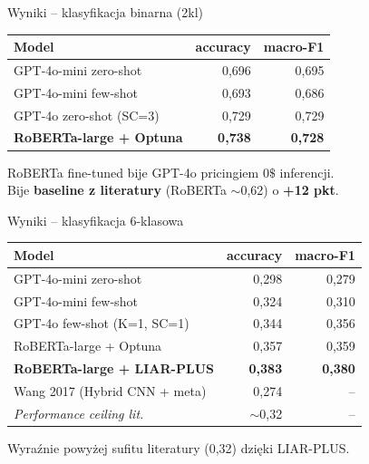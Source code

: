 \documentclass[10pt]{beamer}
\begin{document}
\begin{frame}{Wyniki -- klasyfikacja binarna (2kl)}
  \begin{center}
  \begin{tabular}{lrr}
    \toprule
    Model & accuracy & macro-F1 \\
    \midrule
    GPT-4o-mini zero-shot     & 0{,}696 & 0{,}695 \\
    GPT-4o-mini few-shot      & 0{,}693 & 0{,}686 \\
    GPT-4o zero-shot (SC=3)   & 0{,}729 & 0{,}729 \\
    \textbf{RoBERTa-large + Optuna} & \textbf{0{,}738} & \textbf{0{,}728} \\
    \bottomrule
  \end{tabular}
  \end{center}

  \vspace{0.5em}
  RoBERTa fine-tuned bije GPT-4o pricingiem 0$\$$ inferencji.
  \\ Bije \textbf{baseline z literatury} (RoBERTa $\sim$0{,}62) o \textbf{+12 pkt}.
\end{frame}

\begin{frame}{Wyniki -- klasyfikacja 6-klasowa}
  \begin{center}
  \begin{tabular}{lrr}
    \toprule
    Model & accuracy & macro-F1 \\
    \midrule
    GPT-4o-mini zero-shot       & 0{,}298 & 0{,}279 \\
    GPT-4o-mini few-shot        & 0{,}324 & 0{,}310 \\
    GPT-4o few-shot (K=1, SC=1) & 0{,}344 & 0{,}356 \\
    RoBERTa-large + Optuna      & 0{,}357 & 0{,}359 \\
    \textbf{RoBERTa-large + LIAR-PLUS} & \textbf{0{,}383} & \textbf{0{,}380} \\
    \midrule
    Wang 2017 (Hybrid CNN + meta) & 0{,}274 & -- \\
    \emph{Performance ceiling lit.} & $\sim$0{,}32 & -- \\
    \bottomrule
  \end{tabular}
  \end{center}

  \vspace{0.5em}
  Wyraźnie powyżej sufitu literatury (0{,}32) dzięki LIAR-PLUS.
\end{frame}
\end{document}
